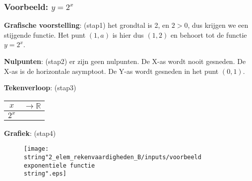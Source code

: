 \subsubsection{Voorbeeld: ${\displaystyle y=2^{x}}$}

\textbf{Grafische voorstelling}: (stap1) het grondtal is 2, en $2>0$,
dus krijgen we een stijgende functie. Het punt $(1,a)$ is hier dus
$(1,2)$ en behoort tot de functie ${\displaystyle y=2^{x}}$.\medskip{}


\noindent \textbf{Nulpunten}: (stap2) er zijn geen nulpunten. De X-as
wordt nooit gesneden. De X-as is de horizontale asymptoot. De Y-as
wordt gesneden in het punt $(0,1)$.\medskip{}


\noindent \textbf{Tekenverloop}: (stap3) %
\begin{tabular}{|c||c|}
\hline 
$x$ & ${\displaystyle \longrightarrow\mathbb{R}}$\tabularnewline
\hline 
\hline 
\multirow{1}{*}{${\displaystyle 2^{x}}$} & \tabularnewline
\hline 
\end{tabular}

\noindent \textbf{Grafiek}: (stap4) 
\begin{figure}
\centering
\texttt{[image: \\string"2\_elem\_rekenvaardigheden\_B/inputs/voorbeeld exponentiele functie\\string".eps]}
\end{figure}

